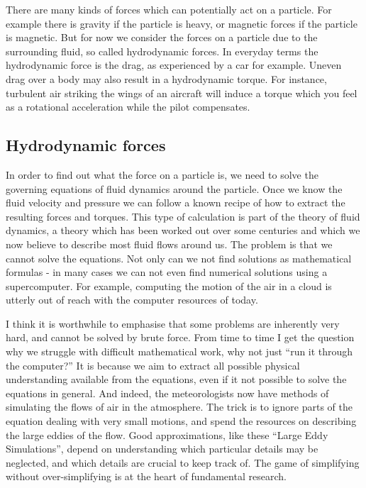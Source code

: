 \documentclass[thesis.tex]{subfiles}
\begin{document}
There are many kinds of forces which can potentially act on a particle. For example there is gravity if the particle is heavy, or magnetic forces if the particle is magnetic. But for now we consider the forces on a particle due to the surrounding fluid, so called hydrodynamic forces. In everyday terms the hydrodynamic force is the drag, as experienced by a car for example. Uneven drag over a body may also result in a hydrodynamic torque. For instance, turbulent air striking the wings of an aircraft will induce a torque which you feel as a rotational acceleration while the pilot compensates.

\subsection*{Hydrodynamic forces}

In order to find out what the force on a particle is, we need to solve the governing equations of fluid dynamics around the particle. Once we know the fluid velocity and pressure we can follow a known recipe of how to extract the resulting forces and torques. This type of calculation is part of the theory of fluid dynamics, a theory which has been worked out over some centuries and which we now believe to describe most fluid flows around us. The problem is that we cannot solve the equations. Not only can we not find solutions as mathematical formulas - in many cases we can not even find numerical solutions using a supercomputer. For example, computing the motion of the air in a cloud is utterly out of reach with the computer resources of today.

I think it is worthwhile to emphasise that some problems are inherently very hard, and cannot be solved by brute force. From time to time I get the question why we struggle with difficult mathematical work, why not just ``run it through the computer?'' It is because we aim to extract all possible physical understanding available from the equations, even if it not possible to solve the equations in general. And indeed, the meteorologists now have methods of simulating the flows of air in the atmosphere. The trick is to ignore parts of the equation dealing with very small motions, and spend the resources on describing the large eddies of the flow. Good approximations, like these ``Large Eddy Simulations'', depend on understanding which particular details may be neglected, and which details are crucial to keep track of. The game of simplifying without over-simplifying is at the heart of fundamental research.
\end{document}
